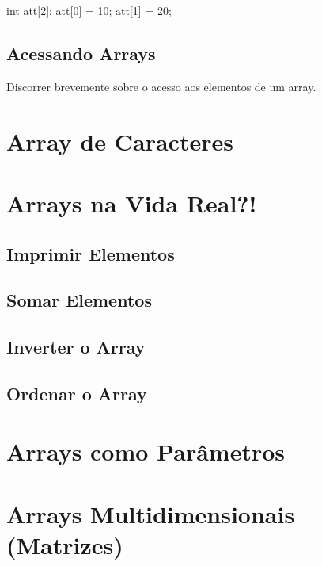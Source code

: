 \begin{ccode}
  int att[2];
  att[0] = 10;
  att[1] = 20;
\end{ccode}

\subsection{Acessando Arrays}

Discorrer brevemente sobre o acesso aos elementos de um array.

\section{Array de Caracteres}

\section{Arrays na Vida Real?!}
\subsection{Imprimir Elementos}
\subsection{Somar Elementos}
\subsection{Inverter o Array}
\subsection{Ordenar o Array}

\section{Arrays como Parâmetros}

\section{Arrays Multidimensionais (Matrizes)}


